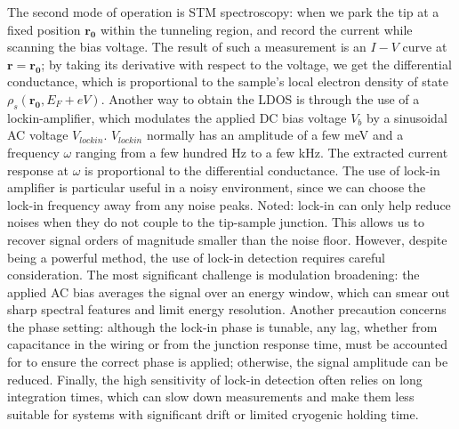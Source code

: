 The second mode of operation is \ac{STM} spectroscopy: when we park the tip at a fixed position $\mathbf{r_0}$ within the tunneling region, and record the current while scanning the bias voltage. The result of such a measurement is an $I-V$ curve at $\mathbf{r} = \mathbf{r_0}$; by taking its derivative with respect to the voltage, we get the differential conductance, which is proportional to the sample's local electron density of state $\rho_s(\mathbf{r_0}, E_F+eV)$. Another way to obtain the LDOS is through the use of a lockin-amplifier, which modulates the applied DC bias voltage $V_b$ by a sinusoidal AC voltage $V_{lockin}$.  $V_{lockin}$ normally has an amplitude of a few meV and a frequency $\omega$ ranging from a few hundred Hz to a few kHz. The extracted current response at $\omega$ is proportional to the differential conductance. The use of lock-in amplifier is particular useful in a noisy environment, since we can choose the lock-in frequency away from any noise peaks. Noted: lock-in can only help reduce noises when they do not couple to the tip-sample junction. This allows us to recover signal orders of magnitude smaller than the noise floor. However, despite being a powerful method, the use of lock-in detection requires careful consideration. The most significant challenge is modulation broadening: the applied AC bias averages the signal over an energy window, which can smear out sharp spectral features and limit energy resolution. Another precaution concerns the phase setting: although the lock-in phase is tunable, any lag, whether from capacitance in the wiring or from the junction response time, must be accounted for to ensure the correct phase is applied; otherwise, the signal amplitude can be reduced. Finally, the high sensitivity of lock-in detection often relies on long integration times, which can slow down measurements and make them less suitable for systems with significant drift or limited cryogenic holding time.

